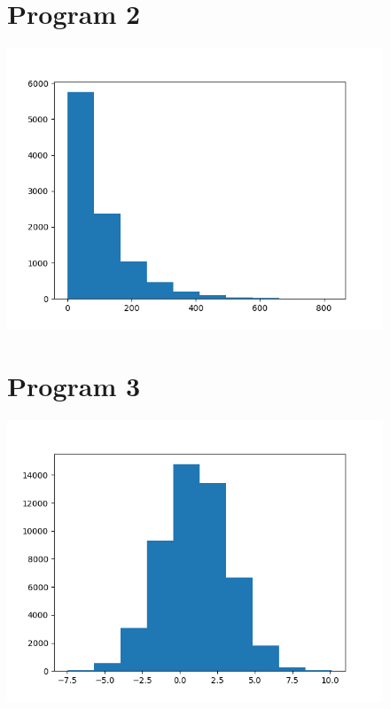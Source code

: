\documentclass[12pt]{article}%
\theoremstyle{definition}
\begin{document}
	
	\begin{figure}[h]
	\section{Program 2}
			\includegraphics[scale=0.7]{program2_hist}
		\section{Program 3}
		\includegraphics[scale=0.7]{program3_hist}
	\end{figure}
		
	
	

	
	\newpage
\end{document}
